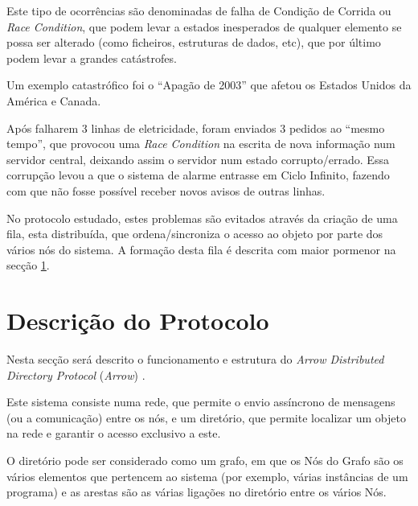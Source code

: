 Este tipo de ocorrências são denominadas de falha de Condição de Corrida ou \emph{Race Condition}, que podem levar a estados inesperados de qualquer elemento se possa ser alterado (como ficheiros, estruturas de dados, etc), 
que por último podem levar a grandes catástrofes.

Um exemplo catastrófico foi o ``Apagão de 2003'' que afetou os Estados Unidos da América e Canada. 


Após falharem 3 linhas de eletricidade, foram enviados 3 pedidos ao ``mesmo tempo'', que provocou uma \emph{Race Condition} na escrita de nova informação num servidor central, deixando assim o servidor num estado corrupto/errado.
Essa corrupção levou a que o sistema de alarme entrasse em Ciclo Infinito, fazendo com que não fosse possível receber novos avisos de outras linhas.

No protocolo estudado, estes problemas são evitados através da criação de uma fila, esta distribuída, que ordena/sincroniza o acesso ao objeto por parte dos vários nós do sistema.
A formação desta fila é descrita com maior pormenor na secção \ref{motivacao:sec:descricao_protocolo}. 

\section{Descrição do Protocolo}
\label{motivacao:sec:descricao_protocolo}

Nesta secção será descrito o funcionamento e estrutura do \textit{Arrow Distributed Directory Protocol} (\emph{Arrow}) \cite{Arrow}. 

Este sistema consiste numa rede, que permite o envio assíncrono de mensagens (ou a comunicação) entre os nós, e um diretório, que permite localizar um objeto na rede e garantir o acesso exclusivo a este. 

O diretório pode ser considerado como um grafo, em que os Nós do Grafo são os vários elementos que pertencem ao sistema (por exemplo, várias instâncias de um programa) e as arestas são as várias ligações no diretório entre os vários Nós.

